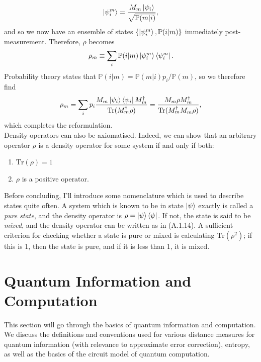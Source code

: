 \documentclass[12pt,a4paper]{report}
\numberwithin{equation}{section}
\newcommand{\ketbra}[2]{\ket{#1}\bra{#2}}
\newcommand{\ketbras}[1]{\ketbra{#1}{#1}}
\theoremstyle{definition}
\theoremstyle{theorem}
\theoremstyle{theorem}
\theoremstyle{example}
\theoremstyle{definition}
\begin{document}
\begin{equation}
	\ket{\psi_{i}^{m}}=\frac{M_{m}\ket{\psi_{i}}}{\sqrt{\mathbb{P}(m|i)}},
\end{equation}
and so we now have an ensemble of states $\{\ket{\psi_{i}^{m}},\mathbb{P}(i|m)\}$ immediately post-measurement. Therefore, $\rho$ becomes
\begin{equation}
	\rho_{m}\equiv\sum_{i}\mathbb{P}(i|m)\ketbras{\psi_{i}^{m}}.
\end{equation}
Probability theory states that $\mathbb{P}(i|m)=\mathbb{P}(m|i)p_{i}/\mathbb{P}(m)$, so we therefore find
\begin{equation}
	\rho_{m}=\sum_{i}p_{i}\frac{M_{m}\ketbras{\psi_{i}}M_{m}^{\dagger}}{\text{Tr}(M_{m}^{\dagger}\rho)}=\frac{M_{m}\rho M_{m}^{\dagger}}{\text{Tr}(M_{m}^{\dagger}M_{m}\rho)},
\end{equation}
which completes the reformulation.\\
Density operators can also be axiomatised. Indeed, we can show that an arbitrary operator $\rho$ is a density operator for some system if and only if both:
\begin{enumerate}
	\item $\text{Tr}(\rho)=1$
	\item $\rho$ is a positive operator.
\end{enumerate}
Before concluding, I'll introduce some nomenclature which is used to describe states quite often. A system which is known to be in state $\ket{\psi}$ exactly is called a \textit{pure state}, and the density operator is $\rho=\ketbras{\psi}$. If not, the state is said to be \textit{mixed}, and the density operator can be written as in (A.1.14). A sufficient criterion for checking whether a state is pure or mixed is calculating $\text{Tr}(\rho^{2})$; if this is 1, then the state is pure, and if it is less than 1, it is mixed. 

\section{Quantum Information and Computation}
This section will go through the basics of quantum information and computation. We discuss the definitions and conventions used for various distance measures for quantum information (with relevance to approximate error correction), entropy, as well as the basics of the circuit model of quantum computation.
\end{document}
